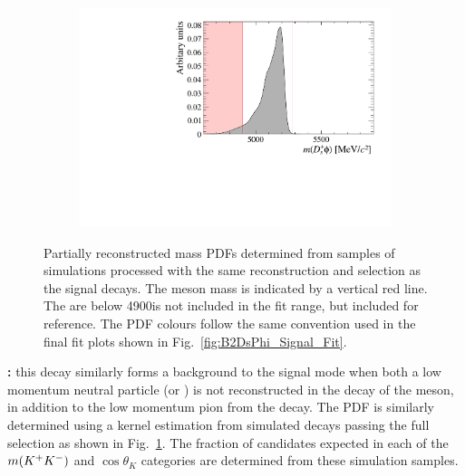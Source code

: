 \begin{figure}[!h]
    \centering
    \begin{subfigure}[t]{0.49\textwidth}
        \includegraphics[width=1.0\textwidth]{figs/B2DsPhi/Bs2Dsa1_4600_5900_Shape.pdf}
    \end{subfigure}
    \caption{Partially reconstructed mass PDFs determined from samples of \decay{\Bsb}{\Dsp\Km\Kstarz} simulations processed with the same reconstruction and selection as the signal decays. The \Bp meson mass is indicated by a vertical red line. The are below 4900\mevcc is not included in the fit range, but included for reference. The PDF colours follow the same convention used in the final fit plots shown in Fig.~\ref{fig:B2DsPhi_Signal_Fit}.}
    \label{fig:B2DsPhi_part_reco_shapes_DsKKstar}   
\end{figure}

\begin{description}
\item \textbf{\decay{\Bsb}{\Dssp\Km\Kstarz}:} this decay similarly forms a background to the signal mode when both a low momentum neutral particle (\piz or \Pgamma) is not reconstructed in the decay of the \Dssp meson, in addition to the low momentum pion from the \Kstarz decay. The PDF is similarly determined using a kernel estimation from simulated decays passing the full selection as shown in Fig.~\ref{fig:B2DsPhi_part_reco_shapes_DsKKstar}. The fraction of candidates expected in each of the $m({{K}^+}{{K}^-})$ and $\cos{\theta_{K}}$ categories are determined from these simulation samples.  

\end{description}

